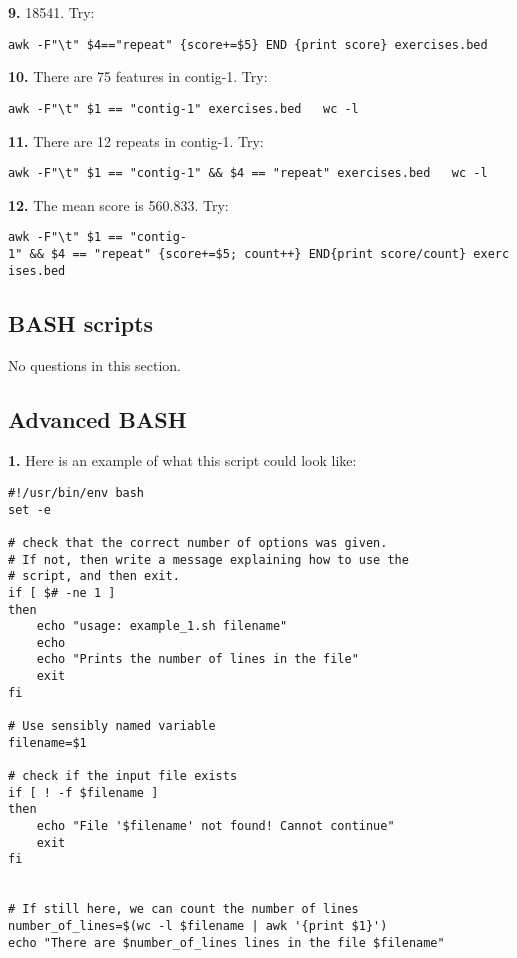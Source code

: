 \documentclass[11pt]{article}
\begin{document}
\textbf{9.} 18541. Try:

\texttt{awk\ -F"\textbackslash{}t"\ \textquotesingle{}\$4=="repeat"\ \{score+=\$5\}\ END\ \{print\ score\}\textquotesingle{}\ exercises.bed}

\textbf{10.} There are 75 features in contig-1. Try:

\texttt{awk\ -F"\textbackslash{}t"\ \textquotesingle{}\$1\ ==\ "contig-1"\textquotesingle{}\ exercises.bed\ \ \textbar{}\ wc\ -l}

\textbf{11.} There are 12 repeats in contig-1. Try:

\texttt{awk\ -F"\textbackslash{}t"\ \textquotesingle{}\$1\ ==\ "contig-1"\ \&\&\ \$4\ ==\ "repeat"\textquotesingle{}\ exercises.bed\ \ \textbar{}\ wc\ -l}

\textbf{12.} The mean score is 560.833. Try:

\texttt{awk\ -F"\textbackslash{}t"\ \textquotesingle{}\$1\ ==\ "contig-1"\ \&\&\ \$4\ ==\ "repeat"\ \{score+=\$5;\ count++\}\ END\{print\ score/count\}\textquotesingle{}\ exercises.bed}

    \hypertarget{bash-scripts}{%
\subsection{BASH scripts}\label{bash-scripts}}

No questions in this section.

\hypertarget{advanced-bash}{%
\subsection{Advanced BASH}\label{advanced-bash}}

\textbf{1.} Here is an example of what this script could look like:

\begin{verbatim}
#!/usr/bin/env bash
set -e

# check that the correct number of options was given.
# If not, then write a message explaining how to use the
# script, and then exit.
if [ $# -ne 1 ]
then
    echo "usage: example_1.sh filename"
    echo
    echo "Prints the number of lines in the file"
    exit
fi

# Use sensibly named variable
filename=$1

# check if the input file exists
if [ ! -f $filename ]
then
    echo "File '$filename' not found! Cannot continue"
    exit
fi


# If still here, we can count the number of lines
number_of_lines=$(wc -l $filename | awk '{print $1}')
echo "There are $number_of_lines lines in the file $filename"
\end{verbatim}
\end{document}
